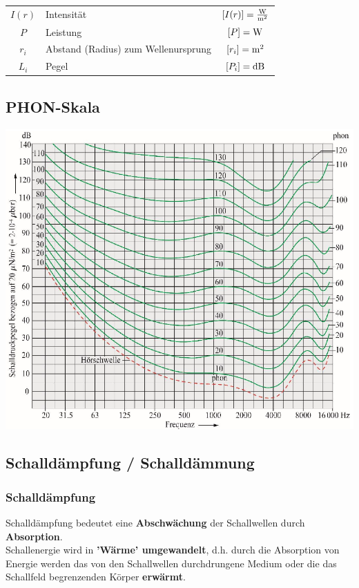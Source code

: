\begin{tabular}{clc}
$I(r)$ & Intensität & $[I(r)] = \frac{\mathrm{W}}{\mathrm{m}^2}$ \\
$P$ & Leistung & $[P] = \mathrm{W}$ \\
$r_i$ & Abstand (Radius) zum Wellenursprung & $[r_i] = \mathrm{m}^2$\\
$L_i$ & Pegel & $[P_i] = \mathrm{dB}$ 
\end{tabular}



\subsection{PHON-Skala}
\includegraphics[width=0.75\linewidth]{Bilder/Wellen-Optik/phon_skala}



\subsection{Schalldämpfung / Schalldämmung}

\subsubsection{Schalldämpfung}

Schalldämpfung bedeutet eine \textbf{Abschwächung} der Schallwellen durch
\textbf{Absorption}. \\ Schallenergie wird in \textbf{'Wärme' umgewandelt}, d.h. durch die
Absorption von Energie werden das von den Schallwellen
durchdrungene Medium oder die das Schallfeld begrenzenden Körper
\textbf{erwärmt}. \\
\vspace{0.2cm}

